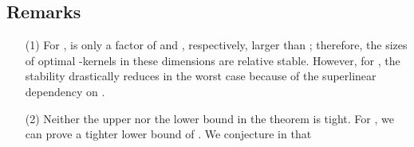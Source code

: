 \documentclass[11pt]{myclass}
\begin{document}
\subsection{Remarks}
\begin{itemize} \denselist
\item[(1)] For ,   is only a factor of  and , respectively, larger than ; therefore, the sizes of optimal -kernels in these dimensions are relative stable. However, for , the stability drastically reduces in the worst case because of the superlinear dependency on .

\item[(2)] Neither the upper nor the lower bound in the theorem is tight. For , we can prove a tighter lower bound of . We conjecture in  that 
 
\end{itemize}








\end{document}
